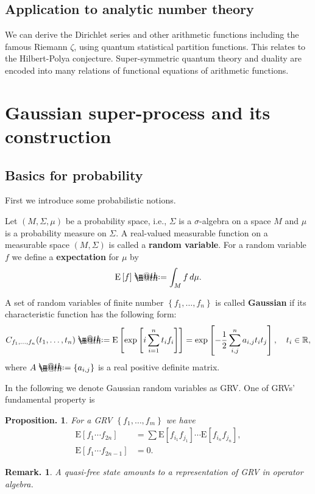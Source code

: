 \documentclass[openany, a4paper, oneside]{jsbook}
\makeatletter
\newcommand*{\defeq}{\mathrel{\rlap{%
\raisebox{0.3ex}{$\m@th\cdot$}}%
\raisebox{-0.3ex}{$\m@th\cdot$}}%
=}
\theoremstyle{break}
\newtheorem{prop}[thm]{Proposition.}
\theoremstyle{breakdefn}
\newtheorem{rem}[thm]{Remark.}
\newcommand{\sqbk}[1]{\left[#1\right]}
\newcommand{\cbk}[1]{\left\{#1\right\}}
\newcommand{\bbR}{\mathbb{R}}
\newcommand{\E}[1]{\rmE\sqbk{#1}}
\newcommand{\rmE}{\mathrm{E}}
\makeatother
\begin{document}
\subsection{Application to analytic number theory \cite{AsaoArai17}}


We can derive the Dirichlet series and other arithmetic functions including the famous Riemann $\zeta$,
using quantum statistical partition functions.
This relates to the Hilbert-Polya conjecture.
Super-symmetric quantum theory and duality are encoded into many relations of functional equations of arithmetic functions.
\section{Gaussian super-process and its construction}

\subsection{Basics for probability}


First we introduce some probabilistic notions.

Let $(M, \Sigma, \mu)$ be a probability space, i.e.,
$\Sigma$ is a $\sigma$-algebra on a space $M$ and $\mu$ is a probability measure on $\Sigma$.
A real-valued measurable function on a measurable space $(M, \Sigma)$ is called a \textbf{random variable}.
For a random variable $f$ we define a \textbf{expectation} for $\mu$ by
\begin{align}
 \E{f} \defeq \int_M f \, d \mu.
\end{align}

A set of random variables of finite number $\cbk{f_1, \dots, f_n}$ is called \textbf{Gaussian}
if its characteristic function has the following form:
\begin{align}
 C_{f_1, \dots, f_n} (t_1, \dots, t_n)
 \defeq
 \E{\exp \sqbk{i \sum_{i=1}^n t_i f_i}}
 =
 \exp \sqbk{- \frac{1}{2} \sum_{i,j}^{n} a_{i,j} t_i t_j}, \quad t_i \in \bbR,
\end{align}
where $A \defeq \cbk{a_{i,j}}$ is a real positive definite matrix.

In the following we denote Gaussian random variables as GRV.
One of GRVs' fundamental property is
\begin{prop}
 For a GRV $\cbk{f_1, \dots, f_m}$ we have
 \begin{align}
  \E{f_1 \cdots f_{2n}}
  &=
  \sum \E{f_{i_1} f_{j_1}}  \cdots \E{f_{i_n} f_{j_n}}, \\
  \E{f_1 \cdots f_{2n-1}}
  &= 0.
 \end{align}
\end{prop}
\begin{rem}
 A quasi-free state amounts to a representation of GRV in operator algebra.
\end{rem}
\end{document}
